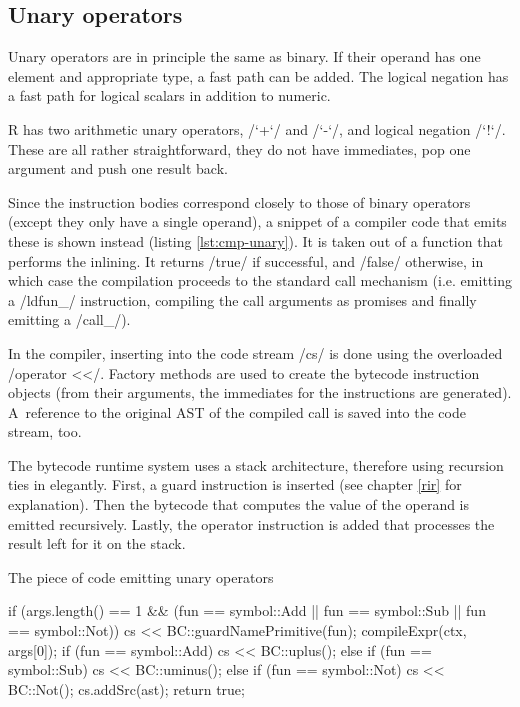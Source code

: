 
\subsection{Unary operators}

Unary operators are in principle the same as binary. If their operand has one element and appropriate type, a fast path can be added. The logical negation has a fast path for logical scalars in addition to numeric.

R has two arithmetic unary operators, \rinline/`+`/ and \rinline/`-`/, and logical negation \rinline/`!`/. These are all rather straightforward, they do not have immediates, pop one argument and push one result back.

Since the instruction bodies correspond closely to those of binary operators (except they only have a single operand), a snippet of a compiler code that emits these is shown instead (listing \ref{lst:cmp-unary}). It is taken out of a function that performs the inlining. It returns \cppinline/true/ if successful, and \cppinline/false/ otherwise, in which case the compilation proceeds to the standard call mechanism (i.e. emitting a \cinline/ldfun_/ instruction, compiling the call arguments as promises and finally emitting a \cinline/call_/).

In the compiler, inserting into the code stream \cppinline/cs/ is done using the overloaded \cppinline/operator <</. Factory methods are used to create the bytecode instruction objects (from their arguments, the immediates for the instructions are generated). A~reference to the original AST of the compiled call is saved into the code stream, too.

The bytecode runtime system uses a stack architecture, therefore using recursion ties in elegantly. First, a guard instruction is inserted (see chapter \ref{rir} for explanation). Then the bytecode that computes the value of the operand is emitted recursively. Lastly, the operator instruction is added that processes the result left for it on the stack.

\begin{listing}[htbp]
  \caption{\label{lst:cmp-unary}The piece of code emitting unary operators}
  \begin{cppcode}
if (args.length() == 1 &&
    (fun == symbol::Add || fun == symbol::Sub ||
     fun == symbol::Not)) {
    cs << BC::guardNamePrimitive(fun);
    compileExpr(ctx, args[0]);
    if (fun == symbol::Add)
        cs << BC::uplus();
    else if (fun == symbol::Sub)
        cs << BC::uminus();
    else if (fun == symbol::Not)
        cs << BC::Not();
    cs.addSrc(ast);
    return true;
}
  \end{cppcode}
\end{listing}

